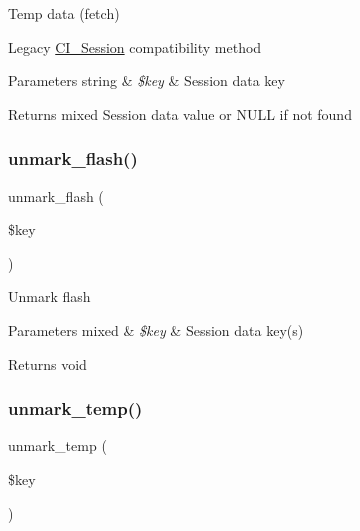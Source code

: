 Temp data (fetch)

Legacy \mbox{\hyperlink{class_c_i___session}{C\+I\+\_\+\+Session}} compatibility method


\begin{DoxyParams}[1]{Parameters}
string & {\em \$key} & Session data key \\
\hline
\end{DoxyParams}
\begin{DoxyReturn}{Returns}
mixed Session data value or N\+U\+LL if not found 
\end{DoxyReturn}
\mbox{\label{class_c_i___session_a8e89303bfdff75a20528986c2bcdba86}} 
\subsubsection{\texorpdfstring{unmark\+\_\+flash()}{unmark\_flash()}}
{\footnotesize\ttfamily unmark\+\_\+flash (\begin{DoxyParamCaption}\item[{}]{\$key }\end{DoxyParamCaption})}

Unmark flash


\begin{DoxyParams}[1]{Parameters}
mixed & {\em \$key} & Session data key(s) \\
\hline
\end{DoxyParams}
\begin{DoxyReturn}{Returns}
void 
\end{DoxyReturn}
\mbox{\label{class_c_i___session_a602eaf2b4a6936ed9bb8750892fac551}} 
\subsubsection{\texorpdfstring{unmark\+\_\+temp()}{unmark\_temp()}}
{\footnotesize\ttfamily unmark\+\_\+temp (\begin{DoxyParamCaption}\item[{}]{\$key }\end{DoxyParamCaption})}

